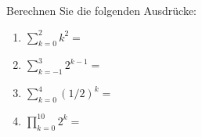 \begin{ExerciseBlock}
Berechnen Sie die folgenden Ausdrücke:
\begin{enumerate}[label=\alph*)]
	\item $\displaystyle \sum_{k=0}^{2} k^2 = $
	\item $\displaystyle \sum_{k=-1}^{3} 2^{k-1} = $
	\item $\displaystyle \sum_{k=0}^{4} (1/2)^k = $
	\item $\displaystyle \prod\limits_{k=0}^{10} 2^k = $
\end{enumerate}

\end{ExerciseBlock}
